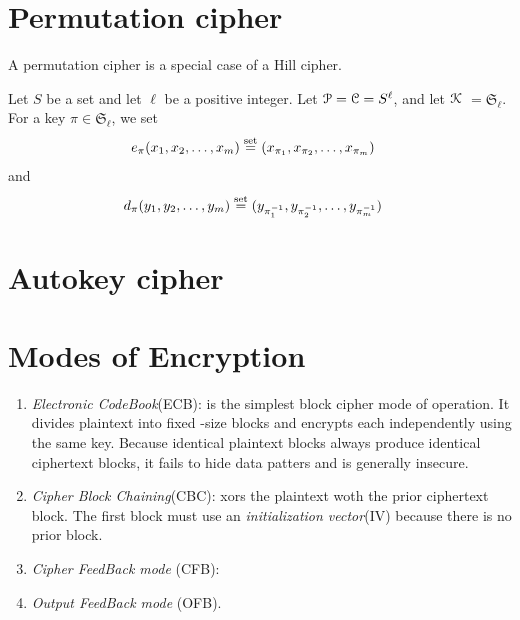 \documentclass[a4paper, 12pt]{book} %
\begin{document}
\section{Permutation cipher}


A permutation cipher is a special case of a Hill cipher.
\begin{definition}
    Let $S$ be a set and let $\ell$ be a positive integer. Let $\EuScript{P} = \EuScript{C} = S^\ell$, and let $\EuScript{K}$ $= \mathfrak{S}_\ell$. For a key $\pi \in \mathfrak{S}_\ell$, we set
    \begin{align}
        e_{\pi}(x_1, x_2, \ldots, x_m) &\overset{\text{set}}{=} (x_{\pi_1}, x_{\pi_2}, \ldots, x_{\pi_m})
    \end{align}
    and
    \begin{align}
        d_{\pi}(y_1, y_2, \ldots, y_m) &\overset{\text{set}}{=} (y_{\pi^{-1}_1}, y_{\pi^{-1}_2}, \ldots, y_{\pi^{-1}_m})   
    \end{align}
\end{definition}




\section{Autokey cipher}


\section{Modes of Encryption}


\begin{enumerate}
    \item \emph{Electronic CodeBook}(ECB): is the simplest block cipher mode of operation. It divides plaintext into fixed -size blocks and encrypts each independently using the same key. Because identical plaintext blocks always produce identical ciphertext blocks, it fails to hide data patters and is generally insecure.
    \item \emph{Cipher Block Chaining}(CBC): xors the plaintext woth the prior ciphertext block. The first block must use an \emph{initialization vector}(IV) because there is no prior block.
    \item \emph{Cipher FeedBack mode} (CFB): 
    \item  \emph{Output FeedBack mode} (OFB).


\end{enumerate}
\end{document}
